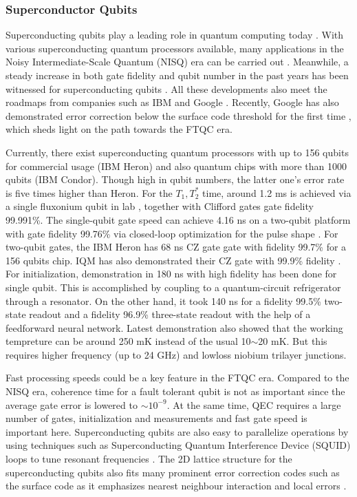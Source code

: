 \subsubsection{Superconductor Qubits}
Superconducting qubits play a leading role in quantum computing today \cite{acharya2024quantumerrorcorrectionsurface}. With various superconducting quantum processors available, many applications in the Noisy Intermediate-Scale Quantum (NISQ) era can be carried out \cite{IBMQuantum}. Meanwhile, a steady increase in both gate fidelity and qubit number in the past years has been witnessed for superconducting qubits \cite{IBMroadmap}. All these developments also meet the roadmaps from companies such as IBM and Google \cite{IBMroadmap}\cite{Googleroadmap}. Recently, Google has also demonstrated error correction below the surface code threshold for the first time \cite{acharya2024quantumerrorcorrectionsurface}, which sheds light on the path towards the FTQC era.

 Currently, there exist superconducting quantum processors with up to 156 qubits for commercial usage (IBM Heron) \cite{IBMQuantum} and also quantum chips with more than 1000 qubits (IBM Condor). Though high in qubit numbers, the latter one's error rate is five times higher than Heron\cite{Afifi-Sabet_2023}. 
 For the $T_1,T_2^*$ time, around 1.2 ms is achieved via a single fluxonium qubit in lab \cite{T1T2}, together with Clifford gates gate fidelity 99.991\%.
 The single-qubit gate speed can achieve 4.16 ns on a two-qubit platform with gate fidelity 99.76\% via closed-loop optimization for the pulse shape \cite{Werninghaus_Egger_Roy_Machnes_Wilhelm_Filipp_2021}.
 For two-qubit gates, the IBM Heron has 68 ns CZ gate gate with fidelity 99.7\% for a 156 qubits chip.\cite{IBMQuantum} IQM has also demonstrated their CZ gate with 99.9\% fidelity \cite{IQM}.
 For initialization, demonstration in 180 ns with high fidelity has been done for single qubit. This is accomplished by coupling to a quantum-circuit refrigerator through a resonator.
 On the other hand, it took 140 ns for a fidelity 99.5\% two-state readout and a fidelity 96.9\% three-state readout with the help of a feedforward neural network.
 Latest demonstration also showed that the working tempreture can be around 250 mK \cite{anferov2024superconductingqubits20ghz} instead of the usual 10$\sim$20 mK. But this requires higher frequency (up to 24 GHz) and lowloss niobium trilayer junctions.
 
 Fast processing speeds could be a key feature in the FTQC era. Compared to the NISQ era, coherence time for a fault tolerant qubit is not as important since the average gate error is lowered to $\sim10^{-9}$. At the same time, QEC requires a large number of gates, initialization and measurements \cite{Fowler_2012} and fast gate speed is important here. Superconducting qubits are also easy to parallelize operations by using techniques such as Superconducting Quantum Interference Device (SQUID) loops to tune resonant frequencies \cite{krantz_quantum_2019}. The 2D lattice structure for the superconducting qubits also fits many prominent error correction codes such as the surface code as it emphasizes nearest neighbour interaction and local errors \cite{Fowler_2012}. 

